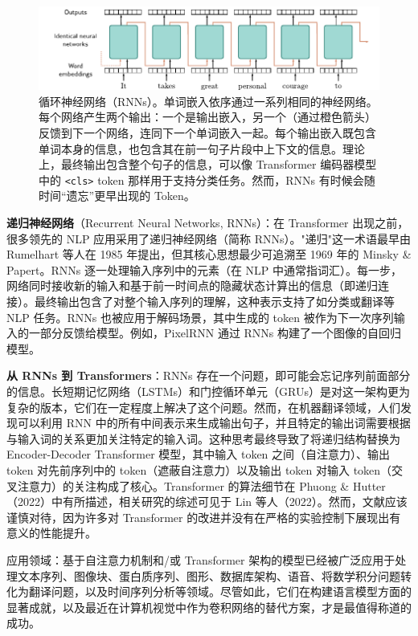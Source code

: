 \documentclass[lang=cn,newtx,10pt,scheme=chinese]{elegantbook}
\begin{document}
\begin{figure}[ht!]
\centering
\includegraphics[width=0.7\linewidth]{PDFFigures/UDLChap12PDF/TransformerRNN.pdf}
\caption{循环神经网络（RNNs）。单词嵌入依序通过一系列相同的神经网络。每个网络产生两个输出：一个是输出嵌入，另一个（通过橙色箭头）反馈到下一个网络，连同下一个单词嵌入一起。每个输出嵌入既包含单词本身的信息，也包含其在前一句子片段中上下文的信息。理论上，最终输出包含整个句子的信息，可以像 Transformer 编码器模型中的 \texttt{\textless cls\textgreater} token 那样用于支持分类任务。然而，RNNs 有时候会随时间“遗忘”更早出现的 Token。}
\end{figure}


\textbf{递归神经网络}（Recurrent Neural Networks, RNNs）：在 Transformer 出现之前，很多领先的 NLP 应用采用了递归神经网络（简称 RNNs）。"递归"这一术语最早由 Rumelhart 等人在 1985 年提出，但其核心思想最少可追溯至 1969 年的 Minsky \& Papert。RNNs 逐一处理输入序列中的元素（在 NLP 中通常指词汇）。每一步，网络同时接收新的输入和基于前一时间点的隐藏状态计算出的信息（即递归连接）。最终输出包含了对整个输入序列的理解，这种表示支持了如分类或翻译等 NLP 任务。RNNs 也被应用于解码场景，其中生成的 token 被作为下一次序列输入的一部分反馈给模型。例如，PixelRNN 通过 RNNs 构建了一个图像的自回归模型。

\textbf{从 RNNs 到 Transformers}：RNNs 存在一个问题，即可能会忘记序列前面部分的信息。长短期记忆网络（LSTMs）和门控循环单元（GRUs）是对这一架构更为复杂的版本，它们在一定程度上解决了这个问题。然而，在机器翻译领域，人们发现可以利用 RNN 中的所有中间表示来生成输出句子，并且特定的输出词需要根据与输入词的关系更加关注特定的输入词。这种思考最终导致了将递归结构替换为 Encoder-Decoder Transformer 模型，其中输入 token 之间（自注意力）、输出 token 对先前序列中的 token（遮蔽自注意力）以及输出 token 对输入 token（交叉注意力）的关注构成了核心。Transformer 的算法细节在 Phuong \& Hutter（2022）中有所描述，相关研究的综述可见于 Lin 等人（2022）。然而，文献应该谨慎对待，因为许多对 Transformer 的改进并没有在严格的实验控制下展现出有意义的性能提升。

应用领域：基于自注意力机制和/或 Transformer 架构的模型已经被广泛应用于处理文本序列、图像块、蛋白质序列、图形、数据库架构、语音、将数学积分问题转化为翻译问题，以及时间序列分析等领域。尽管如此，它们在构建语言模型方面的显著成就，以及最近在计算机视觉中作为卷积网络的替代方案，才是最值得称道的成功。
\end{document}
